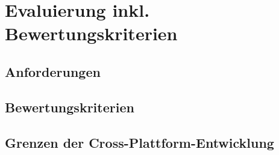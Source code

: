 \chapter{Evaluierung inkl. Bewertungskriterien}
\section{Anforderungen}
\section{Bewertungskriterien}
\section{Grenzen der Cross-Plattform-Entwicklung}